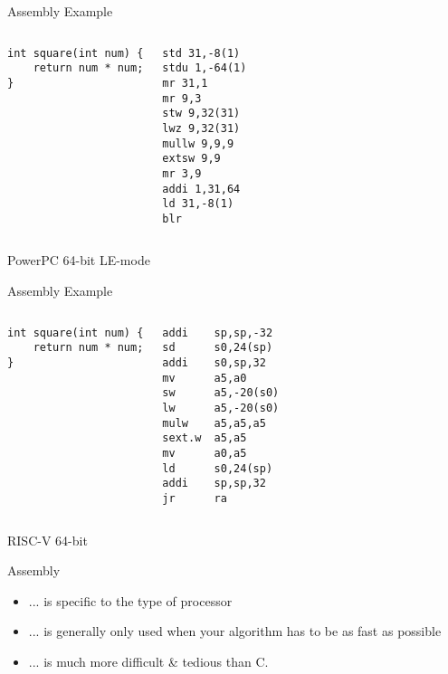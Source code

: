 \documentclass[graphics]{beamer}
\begin{document}
\begin{frame}[fragile]{Assembly Example}
    \begin{columns}
            \begin{verbatim}
int square(int num) {
    return num * num;
}
            \end{verbatim}
            \footnotesize
            \begin{verbatim}
std 31,-8(1)
stdu 1,-64(1)
mr 31,1
mr 9,3
stw 9,32(31)
lwz 9,32(31)
mullw 9,9,9
extsw 9,9
mr 3,9
addi 1,31,64
ld 31,-8(1)
blr
    \end{verbatim}
    \end{columns}
    \vfill
    PowerPC 64-bit LE-mode
\end{frame}

\begin{frame}[fragile]{Assembly Example}
    \begin{columns}
            \begin{verbatim}
int square(int num) {
    return num * num;
}
            \end{verbatim}
            \footnotesize
            \begin{verbatim}
addi    sp,sp,-32
sd      s0,24(sp)
addi    s0,sp,32
mv      a5,a0
sw      a5,-20(s0)
lw      a5,-20(s0)
mulw    a5,a5,a5
sext.w  a5,a5
mv      a0,a5
ld      s0,24(sp)
addi    sp,sp,32
jr      ra
    \end{verbatim}
    \end{columns}
    \vfill
    RISC-V 64-bit
\end{frame}

\begin{frame}{Assembly}
    \begin{itemize}
        \item ... is specific to the type of processor
        \item ... is generally only used when your algorithm has to be as fast as possible
        \item ... is much more difficult \& tedious than C.
    \end{itemize}
\end{frame}
\end{document}
